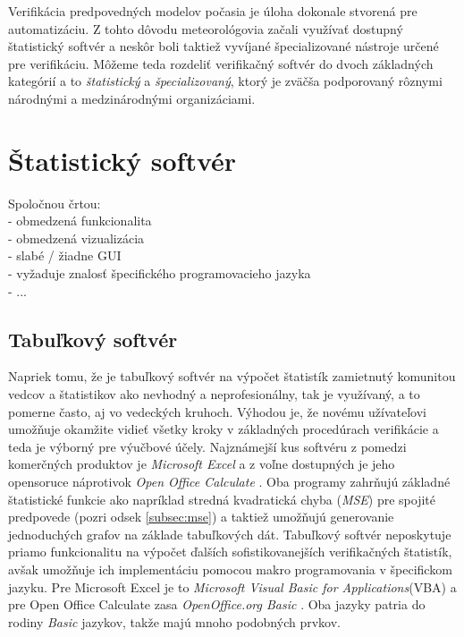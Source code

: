 
Verifikácia predpovedných modelov počasia je úloha dokonale stvorená pre automatizáciu. 
Z tohto dôvodu meteorológovia začali využívať dostupný štatistický softvér 
a neskôr boli taktiež vyvíjané špecializované nástroje určené pre verifikáciu.
Môžeme teda rozdeliť verifikačný softvér do dvoch základných kategórií a to \textit{štatistický} a \textit{špecializovaný}, ktorý je zväčša podporovaný rôznymi národnými a medzinárodnými organizáciami.

\section{Štatistický softvér}
Spoločnou črtou: \\
	- obmedzená funkcionalita \\
	- obmedzená vizualizácia \\
	- slabé / žiadne GUI \\
	- vyžaduje znalosť špecifického programovacieho jazyka \\
	- ...


\subsection{Tabuľkový softvér}
Napriek tomu, že je tabuľkový softvér na výpočet štatistík zamietnutý komunitou vedcov a štatistikov ako nevhodný a neprofesionálny, tak je využívaný, a to pomerne často, aj vo vedeckých kruhoch. 
Výhodou je, že novému užívateľovi umožňuje okamžite vidieť všetky kroky v základných procedúrach verifikácie a teda je výborný pre výučbové účely. \cite{VerifSoft} 
Najznámejší kus softvéru z pomedzi komerčných produktov je \textit{Microsoft Excel} \cite{Excel} a z voľne dostupných je jeho opensoruce náprotivok \textit{Open Office Calculate} \cite{OpenOfficeCalc}. Oba programy zahrňujú základné štatistické funkcie ako napríklad stredná kvadratická chyba (\textit{MSE}) pre spojité predpovede (pozri odsek \ref{subsec:mse}) a taktiež umožňujú generovanie jednoduchých grafov na základe tabuľkových dát. Tabuľkový softvér neposkytuje priamo funkcionalitu na výpočet ďalších sofistikovanejších verifikačných štatistík, avšak umožňuje ich implementáciu pomocou makro programovania v špecifickom jazyku. Pre Microsoft Excel je to \textit{Microsoft Visual Basic for Applications}(VBA) \cite{VBA} a pre Open Office Calculate zasa \textit{OpenOffice.org Basic} \cite{OpenOfficeBasic}. Oba jazyky patria do rodiny \textit{Basic} jazykov, takže majú mnoho podobných prvkov.  


